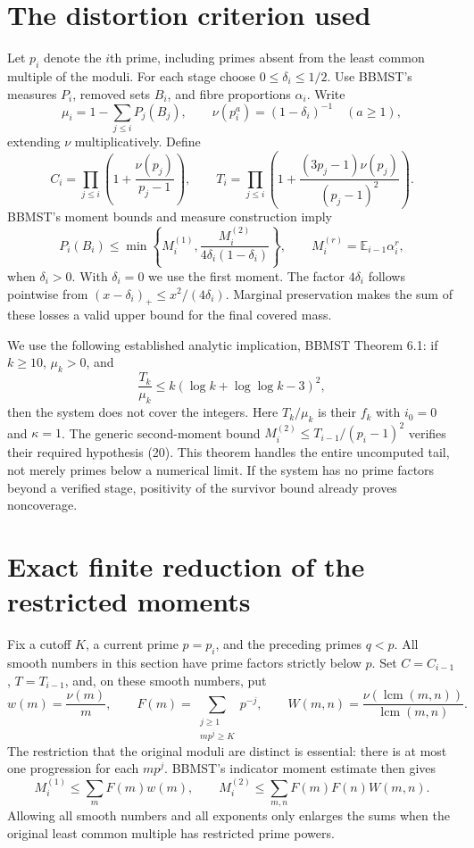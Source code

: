 \documentclass[11pt]{article}
\newcommand{\E}{\mathbb E}
\begin{document}
\section{The distortion criterion used}
Let $p_i$ denote the $i$th prime, including primes absent from the least common
multiple of the moduli. For each stage choose $0\leq\delta_i\leq1/2$.
Use BBMST's measures $P_i$, removed sets $B_i$, and fibre proportions $\alpha_i$.
Write
\[
 \mu_i=1-\sum_{j\leq i}P_j(B_j),\qquad
 \nu(p_i^a)=(1-\delta_i)^{-1}\quad(a\geq1),
\]
extending $\nu$ multiplicatively. Define
\[
 C_i=\prod_{j\leq i}\left(1+\frac{\nu(p_j)}{p_j-1}\right),\qquad
 T_i=\prod_{j\leq i}\left(1+
             \frac{(3p_j-1)\nu(p_j)}{(p_j-1)^2}\right).
\]
BBMST's moment bounds and measure construction imply
\begin{equation}\label{eq:loss}
 P_i(B_i)\leq
 \min\left\{M_i^{(1)},\frac{M_i^{(2)}}{4\delta_i(1-\delta_i)}\right\},
 \qquad M_i^{(r)}=\E_{i-1}\alpha_i^r,
\end{equation}
when $\delta_i>0$. With $\delta_i=0$ we use the first moment.
The factor $4\delta_i$ follows pointwise from
$(x-\delta_i)_+\leq x^2/(4\delta_i)$.
Marginal preservation makes the sum of these losses a valid upper bound for
the final covered mass.

We use the following established analytic implication, BBMST Theorem 6.1:
if $k\geq10$, $\mu_k>0$, and
\begin{equation}\label{eq:stop}
 \frac{T_k}{\mu_k}\leq k(\log k+\log\log k-3)^2,
\end{equation}
then the system does not cover the integers. Here $T_k/\mu_k$ is their $f_k$
with $i_0=0$ and $\kappa=1$. The generic second-moment bound
$M_i^{(2)}\leq T_{i-1}/(p_i-1)^2$ verifies their required hypothesis (20).
This theorem handles the entire uncomputed tail, not merely primes below a
numerical limit. If the system has no prime factors beyond a verified stage,
positivity of the survivor bound already proves noncoverage.

\section{Exact finite reduction of the restricted moments}
Fix a cutoff $K$, a current prime $p=p_i$, and the preceding primes $q<p$.
All smooth numbers in this section have prime factors strictly below $p$.
Set $C=C_{i-1}$, $T=T_{i-1}$, and, on these smooth numbers, put
\[
 w(m)=\frac{\nu(m)}m,\qquad
 F(m)=\sum_{\substack{j\geq1\\mp^j\geq K}}p^{-j},\qquad
 W(m,n)=\frac{\nu(\operatorname{lcm}(m,n))}{\operatorname{lcm}(m,n)}.
\]
The restriction that the original moduli are distinct is essential: there is
at most one progression for each $mp^j$. BBMST's indicator moment estimate
then gives
\begin{equation}\label{eq:restricted}
 M_i^{(1)}\leq\sum_m F(m)w(m),\qquad
 M_i^{(2)}\leq\sum_{m,n}F(m)F(n)W(m,n).
\end{equation}
Allowing all smooth numbers and all exponents only enlarges the sums when the
original least common multiple has restricted prime powers.
\end{document}
